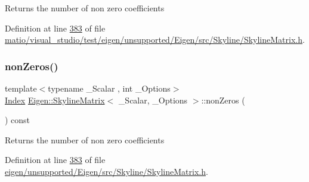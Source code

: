 \begin{DoxyReturn}{Returns}
the number of non zero coefficients 
\end{DoxyReturn}


Definition at line \hyperlink{matio_2visual__studio_2test_2eigen_2unsupported_2_eigen_2src_2_skyline_2_skyline_matrix_8h_source_l00383}{383} of file \hyperlink{matio_2visual__studio_2test_2eigen_2unsupported_2_eigen_2src_2_skyline_2_skyline_matrix_8h_source}{matio/visual\+\_\+studio/test/eigen/unsupported/\+Eigen/src/\+Skyline/\+Skyline\+Matrix.\+h}.

\mbox{\label{class_eigen_1_1_skyline_matrix_aea6d3b694cef560f15a7d18c1f010604}} 
\subsubsection{\texorpdfstring{non\+Zeros()}{nonZeros()}\hspace{0.1cm}{\footnotesize\ttfamily [2/2]}}
{\footnotesize\ttfamily template$<$typename \+\_\+\+Scalar , int \+\_\+\+Options$>$ \\
\hyperlink{group___core___module_a554f30542cc2316add4b1ea0a492ff02}{Index} \hyperlink{class_eigen_1_1_skyline_matrix}{Eigen\+::\+Skyline\+Matrix}$<$ \+\_\+\+Scalar, \+\_\+\+Options $>$\+::non\+Zeros (\begin{DoxyParamCaption}{ }\end{DoxyParamCaption}) const\hspace{0.3cm}{\ttfamily [inline]}}

\begin{DoxyReturn}{Returns}
the number of non zero coefficients 
\end{DoxyReturn}


Definition at line \hyperlink{eigen_2unsupported_2_eigen_2src_2_skyline_2_skyline_matrix_8h_source_l00383}{383} of file \hyperlink{eigen_2unsupported_2_eigen_2src_2_skyline_2_skyline_matrix_8h_source}{eigen/unsupported/\+Eigen/src/\+Skyline/\+Skyline\+Matrix.\+h}.

\mbox{\label{class_eigen_1_1_skyline_matrix_aac6da20a87fca9d4cb6b871504497577}} 
